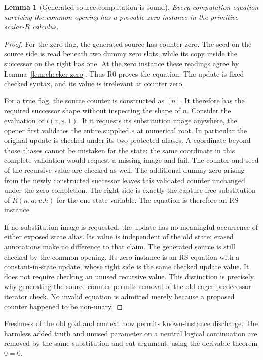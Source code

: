 \documentclass[11pt,letterpaper]{article}
\newtheorem{lemma}[theorem]{Lemma}
\theoremstyle{definition}\newtheorem{definition}[theorem]{Definition}
\theoremstyle{remark}\newtheorem{remark}[theorem]{Remark}
\begin{document}
\begin{lemma}[Generated-source computation is sound]
Every computation equation surviving the common opening has a provable
zero instance in the primitive scalar-$R$ calculus.
\end{lemma}
\begin{proof}
For the zero flag, the generated source has counter zero. The seed on
the source side is read beneath two dummy zero slots, while its copy
inside the successor on the right has one. At the zero instance these
readings agree by Lemma~\ref{lem:checker-zero}. Thus R0 proves the
equation. The update is fixed checked syntax, and its value is irrelevant
at counter zero.

For a true flag, the source counter is constructed as $[n]$. It therefore
has the required successor shape without inspecting the shape of $n$.
Consider the evaluation of $i(v,s,1)$. If it requests its substitution
image anywhere, the opener first validates the entire supplied $s$ at
numerical root. In particular the original update is checked under its
two protected aliases. A coordinate beyond those aliases cannot be
mistaken for the state: the same coordinate in this complete validation
would request a missing image and fail. The counter and seed of the
recursive value are checked as well. The additional dummy zero arising
from the newly constructed successor leaves this validated counter
unchanged under the zero completion. The right side is exactly the
capture-free substitution of $R(n,a;u.h)$ for the one state variable.
The equation is therefore an RS instance.

If no substitution image is requested, the update has no meaningful
occurrence of either exposed state alias. Its value is independent of
the old state; erased annotations make no difference to that
claim. The generated source is still checked by the common opening.
Its zero instance is an RS equation with a constant-in-state update,
whose right side is the same checked update value. It does not require
checking an unused recursive value. This distinction is precisely why
generating the source counter permits removal of the old eager
predecessor-iterator check. No invalid equation is admitted merely
because a proposed counter happened to be non-unary.
\end{proof}

Freshness of the old goal and context now permits known-instance
discharge. The harmless added truth and unused parameter on a neutral
logical continuation are removed by the same substitution-and-cut
argument, using the derivable theorem $0=0$.
\end{document}
